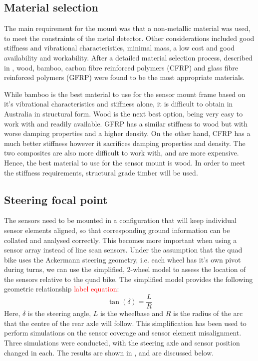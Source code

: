 \documentclass[main.tex]{subfiles}
\begin{document}
\subsection {Material selection}  
The main requirement for the mount was that a non-metallic material was used, to meet the constraints of the metal detector. Other considerations included good stiffness and vibrational characteristics, minimal mass, a low cost and good availability and workability. After a detailed material selection process, described in , wood, bamboo, carbon fibre reinforced polymers (CFRP) and glass fibre reinforced polymers (GFRP) were found to be the most appropriate materials. 

While bamboo is the best material to use for the sensor mount frame based on it's vibrational characteristics and stiffness alone, it is difficult to obtain in Australia in structural form. Wood is the next best option, being very easy to work with and readily available. GFRP has a similar stiffness to wood but with worse damping properties and a higher density. On the other hand, CFRP has a much better stiffness however it sacrifices damping properties and density. The two composites are also more difficult to work with, and are more expensive. Hence, the best material to use for the sensor mount is wood. In order to meet the stiffness requirements, structural grade timber will be used. 
 
%
%

\subsection{Steering focal point}
The sensors need to be mounted in a configuration that will keep individual sensor elements aligned, so that corresponding ground information can be collated and analysed correctly. This becomes more important when using a sensor array instead of line scan sensors. Under the assumption that the quad bike uses the Ackermann steering geometry, i.e. each wheel has it's own pivot during turns, we can use the simplified, 2-wheel model to assess the location of the sensors relative to the quad bike. The simplified model provides the following geometric relationship \textcolor{red}{label equation}:
$$
\tan(\delta) = \frac{L}{R}
$$
Here, $\delta$ is the steering angle, $L$ is the wheelbase and $R$ is the radius of the arc that the centre of the rear axle will follow. This simplification has been used to perform simulations on the sensor coverage and sensor element misalignment.
%
%
Three simulations were conducted, with the steering axle and sensor position changed in each. The results are shown in , and are discussed below.
\end{document}
